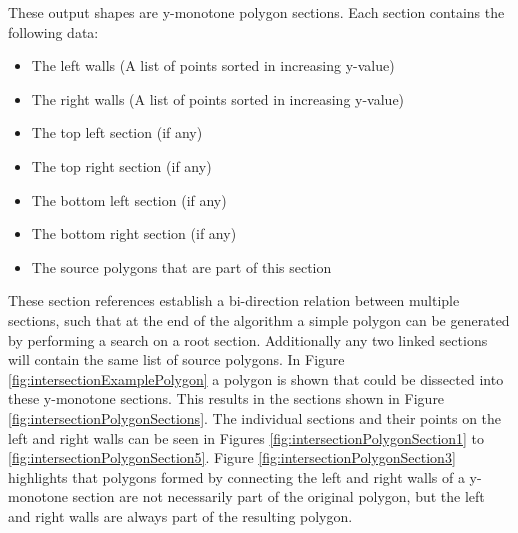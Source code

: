 \documentclass[12pt]{article}
\begin{document}
These output shapes are y-monotone polygon sections. Each section contains the following data:
\begin{itemize}
    \item The left walls (A list of points sorted in increasing y-value)
    \item The right walls (A list of points sorted in increasing y-value)
    \item The top left section (if any)
    \item The top right section (if any)
    \item The bottom left section (if any)
    \item The bottom right section (if any)
    \item The source polygons that are part of this section
\end{itemize}
These section references establish a bi-direction relation between multiple sections, such that at the end of the algorithm a simple polygon can be generated by performing a search on a root section. Additionally any two linked sections will contain the same list of source polygons. 
In Figure \ref{fig:intersectionExamplePolygon} a polygon is shown that could be dissected into these y-monotone sections. This results in the sections shown in Figure \ref{fig:intersectionPolygonSections}. The individual sections and their points on the left and right walls can be seen in Figures \ref{fig:intersectionPolygonSection1} to \ref{fig:intersectionPolygonSection5}. Figure  \ref{fig:intersectionPolygonSection3} highlights that polygons formed by connecting the left and right walls of a y-monotone section are not necessarily part of the original polygon, but the left and right walls are always part of the resulting polygon. 
\end{document}
